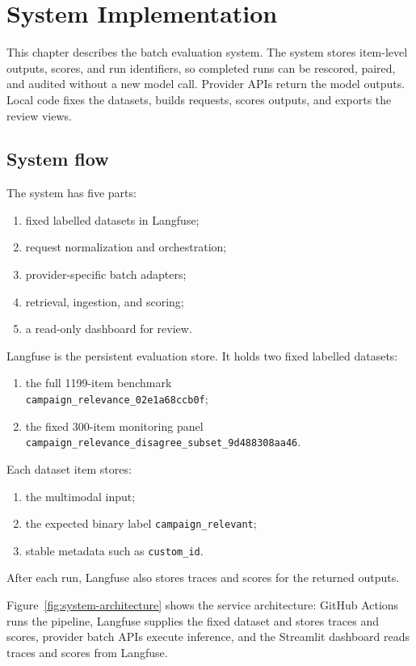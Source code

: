 \chapter{System Implementation}
\label{chap:system-architecture}

This chapter describes the batch evaluation system.
The system stores item-level outputs, scores, and run identifiers,
so completed runs can be rescored, paired, and audited without a new
model call.
Provider APIs return the model outputs.
Local code fixes the datasets, builds requests, scores outputs, and
exports the review views.

\section{System flow}
\label{sec:evaluation-pipeline-overview}
The system has five parts:
\begin{enumerate}
    \item fixed labelled datasets in Langfuse;
    \item request normalization and orchestration;
    \item provider-specific batch adapters;
    \item retrieval, ingestion, and scoring;
    \item a read-only dashboard for review.
\end{enumerate}

Langfuse is the persistent evaluation store.
It holds two fixed labelled datasets:
\begin{enumerate}
    \item the full 1199-item benchmark\\
    \mbox{\texttt{campaign\_relevance\_02e1a68ccb0f}};
    \item the fixed 300-item monitoring panel\\
    \mbox{\texttt{campaign\_relevance\_disagree\_subset\_9d488308aa46}}.
\end{enumerate}
Each dataset item stores:
\begin{enumerate}
    \item the multimodal input;
    \item the expected binary label \texttt{campaign\_relevant};
    \item stable metadata such as \texttt{custom\_id}.
\end{enumerate}
After each run, Langfuse also stores traces and scores for the returned outputs.

Figure~\ref{fig:system-architecture} shows the service architecture:
GitHub Actions runs the pipeline, Langfuse supplies the fixed dataset
and stores traces and scores, provider batch APIs execute inference,
and the Streamlit dashboard reads traces and scores from Langfuse.

